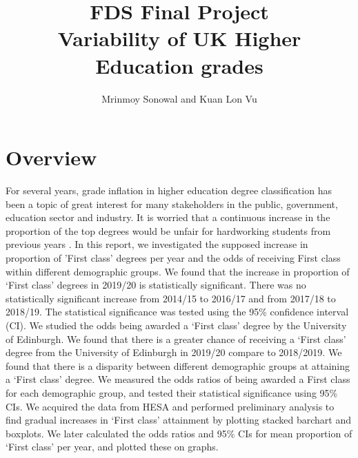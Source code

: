 \documentclass[11pt,a4paper]{article}
\title{FDS Final Project\\Variability of UK Higher Education grades}
\author{Mrinmoy Sonowal and Kuan Lon Vu}
\begin{document}
\maketitle


\section{Overview}
For several years, grade inflation in higher education degree classification has been a topic of great interest for many stakeholders in the public, government, education sector and industry. It is worried that a continuous increase in the proportion of the top degrees would be unfair for hardworking students from previous years \cite{end_inflation}. In this report, we investigated the supposed increase in proportion of 'First class' degrees per year and the odds of receiving First class within different demographic groups. 
We found that the increase in proportion of ‘First class’ degrees in 2019/20 is statistically significant. There was no statistically significant increase from 2014/15 to 2016/17 and from 2017/18 to 2018/19. The statistical significance was tested using the 95\% confidence interval (CI). We studied the odds being awarded a ‘First class’ degree by the University of Edinburgh. We found that there is a greater chance of receiving a ‘First class’ degree from the University of Edinburgh in 2019/20 compare to 2018/2019. We found that there is a disparity between different demographic groups at attaining a ‘First class’ degree. We measured the odds ratios of being awarded a First class for each demographic group, and tested their statistical significance using 95\% CIs. We acquired the data from HESA and performed preliminary analysis to find gradual increases in ‘First class’ attainment by plotting stacked barchart and boxplots. We later calculated the odds ratios and 95\% CIs for mean proportion of ‘First class’ per year, and plotted these on graphs.
\end{document}
